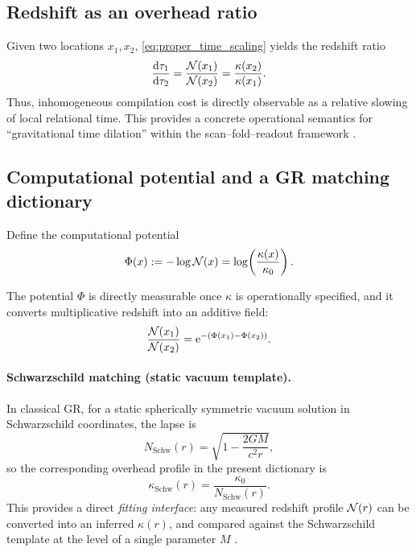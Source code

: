 \subsection{Redshift as an overhead ratio}
\label{sec:redshift_ratio}

Given two locations $x_1,x_2$, \eqref{eq:proper_time_scaling} yields the redshift ratio
\begin{equation}
\label{eq:redshift_ratio}
\frac{\mathrm{d} \tau_1}{\mathrm{d} \tau_2}
=\frac{\mathcal{N}(x_1)}{\mathcal{N}(x_2)}
=\frac{\kappa(x_2)}{\kappa(x_1)}.
\end{equation}
Thus, inhomogeneous compilation cost is directly observable as a relative slowing of local relational time.
This provides a concrete operational semantics for ``gravitational time dilation'' within the scan--fold--readout framework \cite{Ma2025CAP,Ma2025FoP}.

\subsection{Computational potential and a GR matching dictionary}
\label{sec:computational_potential}

\begin{definition}
\label{def:computational_potential}
Define the computational potential
\begin{equation}
\label{eq:Phi_def}
\Phi(x):=-\log \mathcal{N}(x)=\log\!\left(\frac{\kappa(x)}{\kappa_0}\right).
\end{equation}
\end{definition}

The potential $\Phi$ is directly measurable once $\kappa$ is operationally specified, and it converts multiplicative redshift into an additive field:
\[
\frac{\mathcal{N}(x_1)}{\mathcal{N}(x_2)}=\mathrm{e}^{-(\Phi(x_1)-\Phi(x_2))}.
\]

\paragraph{Schwarzschild matching (static vacuum template).}
In classical GR, for a static spherically symmetric vacuum solution in Schwarzschild coordinates, the lapse is
\[
N_{\mathrm{Schw}}(r)=\sqrt{1-\frac{2GM}{c^2 r}},
\]
so the corresponding overhead profile in the present dictionary is
\[
\kappa_{\mathrm{Schw}}(r)=\frac{\kappa_0}{N_{\mathrm{Schw}}(r)}.
\]
This provides a direct \emph{fitting interface}: any measured redshift profile $\mathcal{N}(r)$ can be converted into an inferred $\kappa(r)$, and compared against the Schwarzschild template at the level of a single parameter $M$ \cite{MisnerThorneWheeler1973,Wald1984,Poisson2004}.

